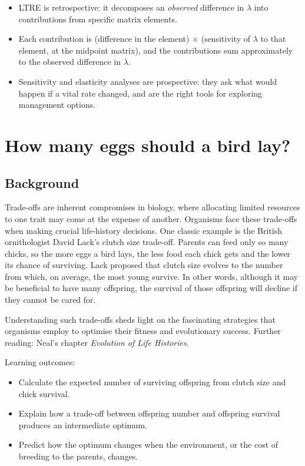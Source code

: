 \documentclass[
  a4paper]{book}
\providecommand{\tightlist}{%
  \setlength{\itemsep}{0pt}\setlength{\parskip}{0pt}}
\begin{document}
\begin{itemize}
\tightlist
\item
  LTRE is retrospective: it decomposes an \emph{observed} difference in \(\lambda\) into contributions from specific matrix elements.
\item
  Each contribution is (difference in the element) × (sensitivity of \(\lambda\) to that element, at the midpoint matrix), and the contributions sum approximately to the observed difference in \(\lambda\).
\item
  Sensitivity and elasticity analyses are prospective: they ask what would happen if a vital rate changed, and are the right tools for exploring management options.
\end{itemize}

\chapter{How many eggs should a bird lay?}\label{how-many-eggs-should-a-bird-lay}

\section{Background}\label{background-11}

Trade-offs are inherent compromises in biology, where allocating limited resources to one trait may come at the expense of another. Organisms face these trade-offs when making crucial life-history decisions. One classic example is the British ornithologist David Lack's clutch size trade-off. Parents can feed only so many chicks, so the more eggs a bird lays, the less food each chick gets and the lower its chance of surviving. Lack proposed that clutch size evolves to the number from which, on average, the most young survive. In other words, although it may be beneficial to have many offspring, the survival of those offspring will decline if they cannot be cared for.

Understanding such trade-offs sheds light on the fascinating strategies that organisms employ to optimise their fitness and evolutionary success. Further reading: Neal's chapter \emph{Evolution of Life Histories}.

Learning outcomes:

\begin{itemize}
\tightlist
\item
  Calculate the expected number of surviving offspring from clutch size and chick survival.
\item
  Explain how a trade-off between offspring number and offspring survival produces an intermediate optimum.
\item
  Predict how the optimum changes when the environment, or the cost of breeding to the parents, changes.
\end{itemize}
\end{document}
